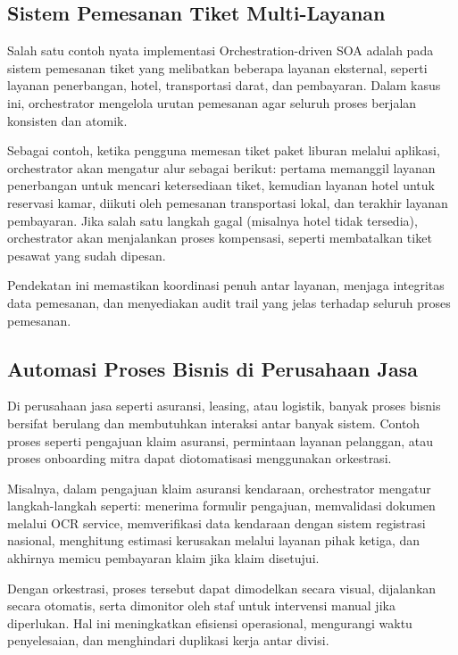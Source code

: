 \subsection{Sistem Pemesanan Tiket Multi-Layanan}

Salah satu contoh nyata implementasi Orchestration-driven SOA adalah pada sistem pemesanan tiket yang melibatkan beberapa layanan eksternal, seperti layanan penerbangan, hotel, transportasi darat, dan pembayaran. Dalam kasus ini, orchestrator mengelola urutan pemesanan agar seluruh proses berjalan konsisten dan atomik.

Sebagai contoh, ketika pengguna memesan tiket paket liburan melalui aplikasi, orchestrator akan mengatur alur sebagai berikut: pertama memanggil layanan penerbangan untuk mencari ketersediaan tiket, kemudian layanan hotel untuk reservasi kamar, diikuti oleh pemesanan transportasi lokal, dan terakhir layanan pembayaran. Jika salah satu langkah gagal (misalnya hotel tidak tersedia), orchestrator akan menjalankan proses kompensasi, seperti membatalkan tiket pesawat yang sudah dipesan.

Pendekatan ini memastikan koordinasi penuh antar layanan, menjaga integritas data pemesanan, dan menyediakan audit trail yang jelas terhadap seluruh proses pemesanan.

\subsection{Automasi Proses Bisnis di Perusahaan Jasa}

Di perusahaan jasa seperti asuransi, leasing, atau logistik, banyak proses bisnis bersifat berulang dan membutuhkan interaksi antar banyak sistem. Contoh proses seperti pengajuan klaim asuransi, permintaan layanan pelanggan, atau proses onboarding mitra dapat diotomatisasi menggunakan orkestrasi.

Misalnya, dalam pengajuan klaim asuransi kendaraan, orchestrator mengatur langkah-langkah seperti: menerima formulir pengajuan, memvalidasi dokumen melalui OCR service, memverifikasi data kendaraan dengan sistem registrasi nasional, menghitung estimasi kerusakan melalui layanan pihak ketiga, dan akhirnya memicu pembayaran klaim jika klaim disetujui.

Dengan orkestrasi, proses tersebut dapat dimodelkan secara visual, dijalankan secara otomatis, serta dimonitor oleh staf untuk intervensi manual jika diperlukan. Hal ini meningkatkan efisiensi operasional, mengurangi waktu penyelesaian, dan menghindari duplikasi kerja antar divisi.

